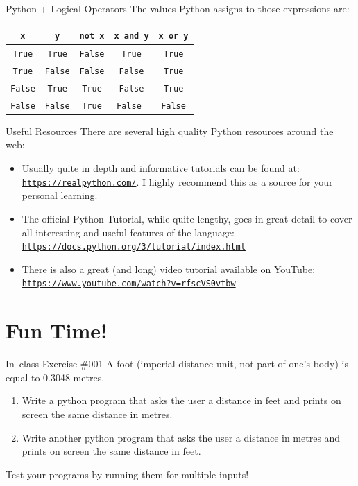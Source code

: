 \documentclass[aspectratio=169, 12pt, xcolor=table]{beamer}
\newcommand{\ohref}[1]{\href{#1}{\texttt{#1}}}
\begin{document}
	\begin{frame}{Python + Logical Operators}
		The values Python assigns to those expressions are:
		
		\vfill
		\centering{}%
		\setlength{\tabcolsep}{14pt}
		\begin{tabular}{ccccc}
			\toprule
			\texttt{x} & \texttt{y} & \texttt{\textbf{not} x} & \texttt{x \textbf{and} y} & \texttt{x \textbf{or} y}\\\midrule
			\texttt{True} & \texttt{True} & \texttt{False} & \texttt{True} & \texttt{True} \\
			\texttt{True} & \texttt{False} & \texttt{False} & \texttt{False} & \texttt{True} \\
			\texttt{False} & \texttt{True} & \texttt{True} & \texttt{False} & \texttt{True} \\
			\texttt{False} & \texttt{False} & \texttt{True} & \texttt{False }& \texttt{False} \\%
			\bottomrule
		\end{tabular}
		\vfill
	\end{frame}

	\begin{frame}{Useful Resources}
		There are several high quality Python resources around the web:
		\begin{itemize}
			\item Usually quite in depth and informative tutorials can be found at: \ohref{https://realpython.com/}. I highly recommend this as a source for your personal learning.
			\item The official Python Tutorial, while quite lengthy, goes in great detail to cover all interesting and useful features of the language: \ohref{https://docs.python.org/3/tutorial/index.html}
			\item There is also a great (and long) video tutorial available on YouTube: \ohref{https://www.youtube.com/watch?v=rfscVS0vtbw}
		\end{itemize}
	\end{frame}

	\section{Fun Time!}\label{sec:fun-time}
	
	\sectionframe
	
	\begin{frame}{In--class Exercise \#001}
		A foot (imperial distance unit, not part of one's body) is equal to 0.3048 metres.
		\begin{enumerate}
			\item Write a python program that asks the user a distance in feet and prints on screen the same distance in metres.
			\item Write another python program that asks the user a distance in metres and prints on screen the same distance in feet.
		\end{enumerate}
		Test your programs by running them for multiple inputs!
	\end{frame}
\end{document}
